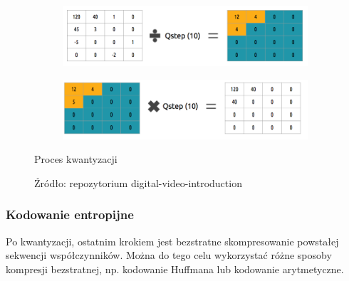 \begin{figure}[H]
    \centering
    \begin{subfigure}{0.48\linewidth}
        \includegraphics[width=.9\linewidth]{img/rozdzial2/quantization_1}
    \end{subfigure}
    \begin{subfigure}{0.48\linewidth}
        \includegraphics[width=.9\linewidth]{img/rozdzial2/quantization_2}
    \end{subfigure}
    \caption{Proces kwantyzacji}
    \caption*{Źródło: repozytorium digital-video-introduction \cite{digital_video_introduction}}
    \label{fig:quantization}
\end{figure}

\subsubsection{Kodowanie entropijne}

Po kwantyzacji, ostatnim krokiem jest bezstratne skompresowanie powstałej sekwencji współczynników.
Można do tego celu wykorzystać różne sposoby kompresji bezstratnej, np. kodowanie Huffmana lub
kodowanie arytmetyczne.




